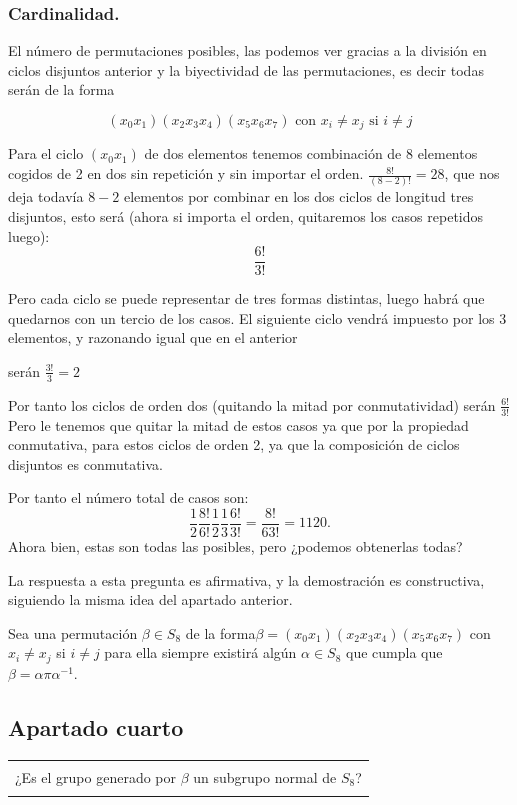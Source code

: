\documentclass[12pt]{article}
\newenvironment{micaja}
{
    \begin{center}
    \begin{tabular}{|p{0.9\textwidth}|}
    \hline\\
    }   
    {   
    \\\\\hline
    \end{tabular} 
    \end{center}
    }
\begin{document}
\subsubsection*{Cardinalidad.}

El número de permutaciones posibles, las podemos ver gracias a la división en ciclos disjuntos anterior 
y la biyectividad de las permutaciones, es decir todas serán de la forma

$$(x_0 x_1)( x_2 x_3 x_4)(x_5 x_6 x_7) \text{ con } x_i \neq x_j \text{ si } i \neq j$$

Para el ciclo $(x_0 x_1)$ de dos elementos tenemos combinación de 8 elementos cogidos de 2 en dos sin repetición y
sin importar el orden.
$\frac{8!}{(8-2)!}=28$, 
que nos deja todavía $8-2$ elementos
por combinar en los dos ciclos de longitud tres disjuntos, esto será 
(ahora si importa el orden, quitaremos los casos repetidos luego):
 $$\frac{6!}{3!} $$

 Pero cada ciclo se puede representar de tres formas distintas, luego habrá que quedarnos
 con un tercio de los casos. 
El siguiente ciclo vendrá impuesto por los 3 elementos, y razonando igual que en el anterior 

 serán $\frac{3!}{3}=2$

 Por tanto los ciclos de orden dos (quitando la mitad por conmutatividad) serán $\frac{6!}{3!}$
 Pero le tenemos que quitar la mitad de estos casos ya que por la propiedad conmutativa, para estos
 ciclos de orden 2,
ya que la composición de ciclos disjuntos es conmutativa.

Por tanto el número total de casos son: 
$$\frac{1}{2}\frac{8!}{6!}\frac{1}{2}\frac{1}{3}\frac{6!}{3!} = \frac{8!}{6 3!} = 1120.$$
Ahora bien, estas son todas las posibles, pero ¿podemos obtenerlas todas?


La respuesta a esta pregunta es afirmativa, y la demostración es constructiva, siguiendo 
la misma idea del apartado anterior. 

Sea una permutación $\beta \in S_8$ de la forma$\beta = (x_0 x_1)( x_2 x_3 x_4)(x_5 x_6 x_7)$ con $x_i \neq x_j$ si $i \neq j$ 
 para ella siempre existirá algún $\alpha \in S_8$ que 
cumpla que $\beta = \alpha \pi \alpha^{-1}$.



\subsection{Apartado cuarto}

\begin{micaja}
    ¿Es el grupo generado por $\beta$ un subgrupo normal de $S_8$?
\end{micaja}
\end{document}

